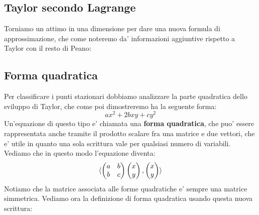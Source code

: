 \documentclass{report}
\begin{document}
\subsection{Taylor secondo Lagrange}
Torniamo un attimo in una dimensione per dare una nuova formula di approssimazione, che come noteremo da' informazioni aggiuntive rispetto a Taylor con il resto di Peano:
\subsection{Forma quadratica}
Per classificare i punti stazionari dobbiamo analizzare la parte quadratica dello sviluppo di Taylor, che come poi dimostreremo ha la seguente forma:
\[
ax^2 + 2bxy + cy^2
\]
Un'equazione di questo tipo e' chiamata una \textbf{forma quadratica}, che puo' essere rappresentata anche tramite il prodotto scalare fra una matrice e due vettori, che e' utile in quanto una sola scrittura vale per qualsiasi numero di variabili. Vediamo che in questo modo l'equazione diventa:
\[
  \langle \begin{pmatrix}
  a & b\\
  b & c\\
  \end{pmatrix}\begin{pmatrix}
  x\\
  y\\
  \end{pmatrix}, \begin{pmatrix}
  x\\
  y\\
  \end{pmatrix} \rangle
\]
Notiamo che la matrice associata alle forme quadratiche e' sempre una matrice simmetrica. Vediamo ora la definizione di forma quadratica usando questa nuova scrittura:
\end{document}
